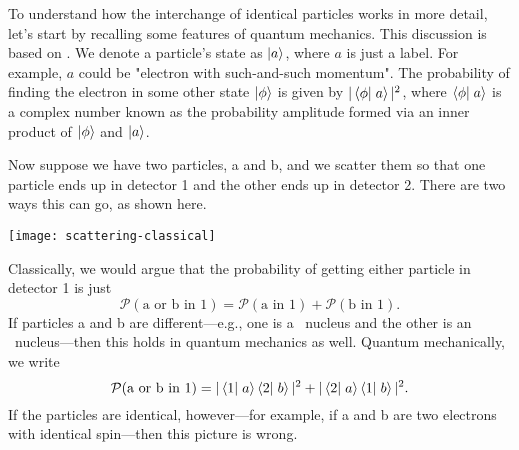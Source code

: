 \begin{sidebar}
\label{sb.identical-particles}
To understand how the interchange of identical particles works in more detail, let's start by recalling some features of quantum mechanics. This discussion is based on  \citet{Feynman1989The-Feynman-Lec}.
We denote a particle's state as $\left|a\right\rangle$, where $a$ is just a label.  For example, $a$ could be "electron with such-and-such momentum".  The probability of finding the electron in some other state $\left|\phi\right\rangle$ is given by $|\left\langle\phi\right|\left.a\right\rangle|^2$, where $\left\langle\phi\right|\left.a\right\rangle$ is a complex number known as the probability amplitude formed via an inner product of $\left|\phi\right\rangle$ and $\left|a\right\rangle$.

Now suppose we have two particles, a and b, and we scatter them so that one particle ends up in detector 1 and the other ends up in detector 2. There are two ways this can go, as shown here.
\begin{center}
\texttt{[image: scattering-classical]}
\end{center}
Classically, we would argue that the probability of getting either particle in detector 1 is just
\begin{equation}
    \mathcal{P}(\textrm{a or b in 1}) = \mathcal{P}(\textrm{a in 1}) + \mathcal{P}(\textrm{b in 1}).
\end{equation}
If particles a and b are different---e.g., one is a \carbon\ nucleus and the other is an \oxygen\ nucleus---then this holds in quantum mechanics as well. Quantum mechanically, we write
\begin{equation}
    \mathcal{P}(\textrm{a or b in 1}) = |\left\langle1\right|\left.a\right\rangle\left\langle2\right|\left.b\right\rangle|^2 + |\left\langle2\right|\left.a\right\rangle\left\langle1\right|\left.b\right\rangle|^2.
\end{equation}
If the particles are identical, however---for example, if a and b are two electrons with identical spin---then this picture is wrong.


\end{sidebar}
